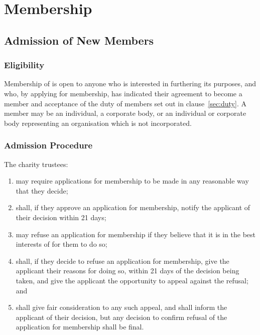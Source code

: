 \section{Membership}\label{sec:membership}

    \subsection{Admission of New Members}\label{sec:admission}

        \subsubsection{Eligibility}\label{sec:eligibility}
        Membership of \shortname{} is open to anyone who is interested in furthering its purposes, and who, by applying for membership, has indicated their agreement to become a member and acceptance of the duty of members set out in clause~\ref{sec:duty}.
        A member may be an individual, a corporate body, or an individual or corporate body representing an organisation which is not incorporated.

        \subsubsection{Admission Procedure}\label{sec:admission_procedure}
        The charity trustees:
        \begin{enumerate}
            \item may require applications for membership to be made in any reasonable way that they decide;
            \item shall, if they approve an application for membership, notify the applicant of their decision within 21 days;
            \item may refuse an application for membership if they believe that it is in the best interests of \shortname{} for them to do so;
            \item shall, if they decide to refuse an application for membership, give the applicant their reasons for doing so, within 21 days of the decision being taken, and give the applicant the opportunity to appeal against the refusal; and
            \item shall give fair consideration to any such appeal, and shall inform the applicant of their decision, but any decision to confirm refusal of the application for membership shall be  final.
        \end{enumerate}


